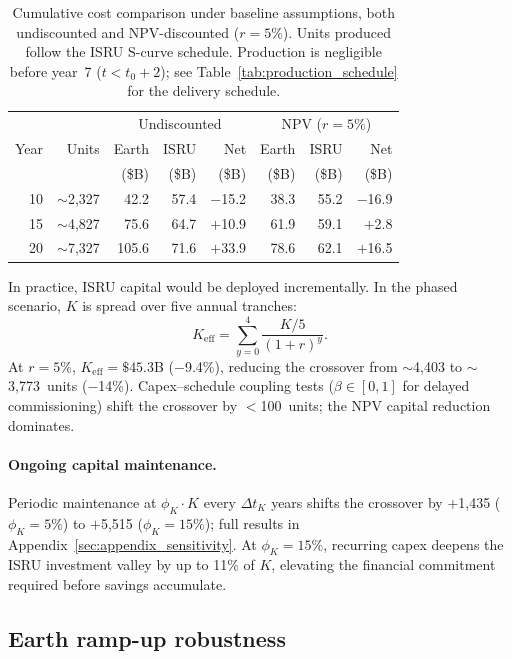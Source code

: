 \documentclass[preprint,12pt]{elsarticle}
\begin{document}
\begin{table}[htbp]
\centering
\caption{Cumulative cost comparison under baseline assumptions, both undiscounted and NPV-discounted ($r = 5\%$). Units produced follow the ISRU S-curve schedule. Production is negligible before year~7 ($t < t_0 + 2$); see Table~\ref{tab:production_schedule} for the delivery schedule.}
\label{tab:cumulative}
\begin{tabular}{@{}rr|rrr|rrr@{}}
\toprule
 & & \multicolumn{3}{c|}{Undiscounted} & \multicolumn{3}{c}{NPV ($r = 5\%$)} \\
Year & Units & Earth & ISRU & Net & Earth & ISRU & Net \\
 & & (\$B) & (\$B) & (\$B) & (\$B) & (\$B) & (\$B) \\
\midrule
10 & $\sim$2{,}327 & 42.2  & 57.4   & $-$15.2 & 38.3  & 55.2  & $-$16.9 \\
15 & $\sim$4{,}827 & 75.6  & 64.7   & $+$10.9 & 61.9  & 59.1  & $+$2.8  \\
20 & $\sim$7{,}327 & 105.6 & 71.6   & $+$33.9 & 78.6  & 62.1  & $+$16.5 \\
\bottomrule
\end{tabular}
\end{table}

In practice, ISRU capital would be deployed incrementally. In the phased scenario, $K$ is spread over five annual tranches:
\begin{equation}
  K_{\mathrm{eff}} = \sum_{y=0}^{4} \frac{K/5}{(1+r)^y}.
  \label{eq:phased_capital}
\end{equation}
At $r = 5\%$, $K_{\mathrm{eff}} = \$45.3$B ($-$9.4\%), reducing the crossover from $\sim$4{,}403 to $\sim$3{,}773~units ($-$14\%). Capex--schedule coupling tests ($\beta \in [0, 1]$ for delayed commissioning) shift the crossover by $<$100~units; the NPV capital reduction dominates.

\paragraph{Ongoing capital maintenance.} Periodic maintenance at $\phi_K \cdot K$ every $\Delta t_K$ years shifts the crossover by $+$1{,}435 ($\phi_K = 5\%$) to $+$5{,}515 ($\phi_K = 15\%$); full results in Appendix~\ref{sec:appendix_sensitivity}. At $\phi_K = 15\%$, recurring capex deepens the ISRU investment valley by up to 11\% of $K$, elevating the financial commitment required before savings accumulate.

\subsection{Earth ramp-up robustness}
\label{sec:earth_ramp}
\end{document}
